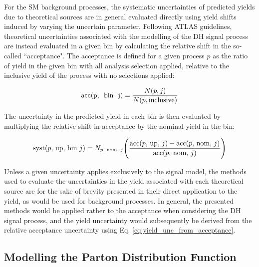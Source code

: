 For the SM background processes, the systematic uncertainties of predicted yields due to theoretical sources are in general evaluated directly using yield shifts induced by varying the uncertain parameter. Following ATLAS guidelines, theoretical uncertainties associated with the modelling of the DH signal process are instead evaluated in a given bin by calculating the relative shift in the so-called ``acceptance". The acceptance is defined for a given process \(p\) as the ratio of yield in the given bin with all analysis selection applied, relative to the inclusive yield of the process with no selections applied:

\begin{equation}
\label{eq:acceptance}
\text{acc(p, \text{ bin } j)} = \frac{N(p, j)}{N(p, \text{inclusive})}
\end{equation}

The uncertainty in the predicted yield in each bin is then evaluated by multiplying the relative shift in acceptance by the nominal yield in the bin:

\begin{equation}
\label{eq:yield_unc_from_acceptance}
\text{syst\text{(\(p\), up, bin \(j\))}} = N_\text{\(p\), nom, \(j\)} \Bigg(\frac{\text{acc(\(p\), up, \(j\))} - \text{acc(\(p\), nom, \(j\))}}{\text{acc(\(p\), nom, \(j\))}}\Bigg)
\end{equation}

Unless a given uncertainty applies exclusively to the signal model, the methods used to evaluate the uncertainties in the yield associated with each theoretical source are for the sake of brevity presented in their direct application to the yield, as would be used for background processes. In general, the presented methods would be applied rather to the acceptance when considering the DH signal process, and the yield uncertainty would subsequently be derived from the relative acceptance uncertainty using Eq. \ref{eq:yield_unc_from_acceptance}.

\subsection{Modelling the Parton Distribution Function}
\label{sec:pdf_unc}

